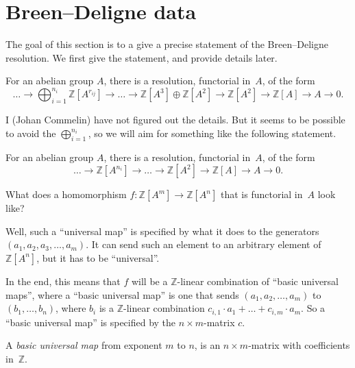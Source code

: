 \section{Breen--Deligne data}

The goal of this section is to a give a precise statement of the Breen--Deligne resolution.
We first give the statement, and provide details later.

\begin{theoremx}
  \label{BD_orig}
  For an abelian group $A$, there is a resolution, functorial in~$A$, of the form
  \[
    \ldots \to \bigoplus_{i=1}^{n_i} \mathbb Z[A^{r_{ij}}] \to \ldots
    \to \mathbb Z[A^3] \oplus \mathbb Z[A^2] \to \mathbb Z[A^2] \to \mathbb Z[A] \to A \to 0.
  \]
\end{theoremx}

I (Johan Commelin) have not figured out the details.
But it seems to be possible to avoid the $\bigoplus_{i=1}^{n_i}$,
so we will aim for something like the following statement.

\begin{theoremx}
  \label{BD_reso}
  For an abelian group $A$, there is a resolution, functorial in~$A$, of the form
  \[
    \ldots \to \mathbb Z[A^{n_{i}}] \to \ldots \to \mathbb Z[A^2] \to \mathbb Z[A] \to A \to 0.
  \]
\end{theoremx}

What does a homomorphism $f \colon \mathbb Z[A^m] \to \mathbb Z[A^n]$
that is functorial in~$A$ look like?

Well, such a ``universal map'' is specified
by what it does to the generators $(a_1, a_2, a_3, \dots, a_m)$.
It can send such an element to an arbitrary element of $\mathbb Z[A^n]$,
but it has to be ``universal''.

In the end, this means that $f$ will be a $\mathbb Z$-linear combination of
``basic universal maps'', where a ``basic universal map'' is one that
sends $(a_1, a_2, \dots, a_m)$ to $(b_1, \dots, b_n)$,
where $b_i$ is a $\mathbb Z$-linear combination $c_{i,1} \cdot a_1 + \dots + c_{i,m} \cdot a_m$.
So a ``basic universal map'' is specified by the $n \times m$-matrix $c$.

\begin{definition}
  \label{basic_universal_map}
  \leanok
  A \emph{basic universal map} from exponent $m$ to $n$,
  is an $n \times m$-matrix with coefficients in~$\mathbb Z$.
\end{definition}

